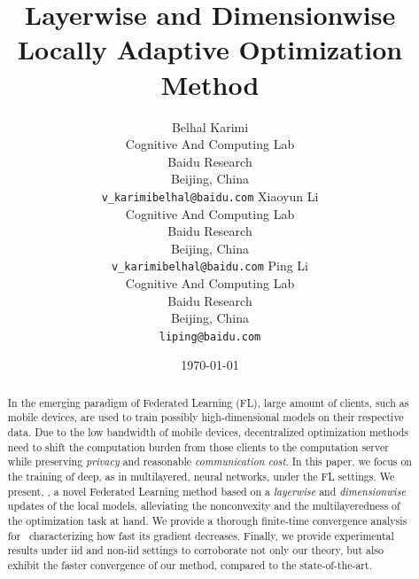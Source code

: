 \documentclass[11pt]{article}
\begin{document}
\title{Layerwise and Dimensionwise Locally Adaptive Optimization Method}


\author{
  Belhal Karimi \\
  Cognitive And Computing Lab\\
  Baidu Research\\
  Beijing, China \\
  \texttt{v_karimibelhal@baidu.com} 
   \And
    Xiaoyun Li \\
  Cognitive And Computing Lab\\
  Baidu Research\\
  Beijing, China \\
  \texttt{v_karimibelhal@baidu.com} 
      \And
  Ping Li \\
  Cognitive And Computing Lab\\
  Baidu Research\\
  Beijing, China \\
  \texttt{liping@baidu.com} \\
}

\date{\today}

\maketitle

\begin{abstract}\vspace{-0.1in}
In the emerging paradigm of Federated Learning (FL), large amount of clients, such as mobile devices, are used to train possibly high-dimensional models on their respective data.
Due to the low bandwidth of mobile devices, decentralized optimization methods need to shift the computation burden from those clients to the computation server while preserving \emph{privacy} and reasonable \emph{communication cost}.
In this paper, we focus on the training of deep, as in multilayered, neural networks, under the FL settings.
We present, \algo, a novel Federated Learning method based on a \emph{layerwise} and \emph{dimensionwise} updates of the local models, alleviating the nonconvexity and the multilayeredness of the optimization task at hand.
We provide a thorough finite-time convergence analysis for \algo\ characterizing how fast its gradient decreases.
Finally, we provide experimental results under iid and non-iid settings to corroborate not only our theory, but also exhibit the faster convergence of our method, compared to the state-of-the-art.
\end{abstract}
\end{document}
